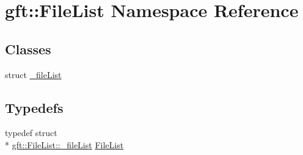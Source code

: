 \hypertarget{namespacegft_1_1FileList}{\section{gft\-:\-:File\-List Namespace Reference}
\label{namespacegft_1_1FileList}
}
\subsection*{Classes}
\begin{DoxyCompactItemize}
\item 
struct \hyperlink{structgft_1_1FileList_1_1__fileList}{\-\_\-file\-List}
\end{DoxyCompactItemize}
\subsection*{Typedefs}
\begin{DoxyCompactItemize}
\item 
typedef struct \\*
\hyperlink{structgft_1_1FileList_1_1__fileList}{gft\-::\-File\-List\-::\-\_\-file\-List} \hyperlink{namespacegft_1_1FileList_a3a0ba3f59376d46215f21160690c6be1}{File\-List}
\end{DoxyCompactItemize}
